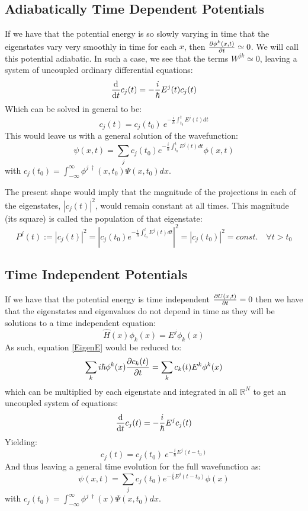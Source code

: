\documentclass[11pt, a4paper]{article} %
\newcommand{\R}{\mathbb{R}} %
\begin{document}
\subsection{Adiabatically Time Dependent Potentials}

If we have that the potential energy is so slowly varying in time that the eigenstates vary very smoothly in time for each $x$, then $\pdv{\phi^k(x,t)}{t}\simeq 0$. We will call this potential adiabatic. In such a case, we see that the terms $W^{jk}\simeq 0$, leaving a system of uncoupled ordinary differential equations:
\begin{equation}
\dv{}{t}c_j(t)=-\frac{i}{\hbar}E^j(t) c_j(t)
\end{equation}
Which can be solved in general to be:
\begin{equation}
c_j(t)=c_j(t_0)\ e^{-\frac{i}{\hbar}\int_{t_0}^{t}E^j(t) dt}
\end{equation}
This would leave us with a general solution of the wavefunction:
\begin{equation}
\psi(x,t)=\sum_j c_j(t_0) e^{-\frac{i}{\hbar}\int_{t_0}^{t}E^j(t) dt} \phi(x,t)
\end{equation}
with $c_j(t_0)=\int_{-\infty}^{\infty}\phi^{j\ \dagger}(x, t_0) \Psi(x,t_0)dx$.

The present shape would imply that the magnitude of the projections in each of the eigenstates, $|c_j(t)|^2$, would remain constant at all times. This magnitude (its square) is called the population of that eigenstate:
$$
P^j(t):=|c_j(t)|^2=|c_j(t_0)e^{-\frac{i}{\hbar}\int_{t_0}^{t}E^j(t) dt}|^2 = |c_j(t_0)|^2=const. \quad \forall t>t_0
$$

\subsection{Time Independent Potentials}

If we have that the potential energy is time independent $\pdv{U(x,t)}{t}=0$ then we have that the eigenstates and eigenvalues do not depend in time as they will be solutions to a time independent equation:
\begin{equation}
\hat{H}(x)\phi_k(x)=E^j\phi_k(x)
\end{equation}
As such, equation \eqref{EigenE} would be reduced to:
\begin{equation}
\sum_k i\hbar \phi^k(x)\pdv{c_k(t)}{t}= \sum_k c_k(t)E^k\phi^k(x)
\end{equation}
which can be multiplied by each eigenstate and integrated in all $\R^N$ to get an uncoupled system of equations:
\begin{equation}
\dv{}{t}c_j(t)=-\frac{i}{\hbar}E^j c_j(t)
\end{equation}
Yielding:
\begin{equation}
c_j(t)=c_j(t_0)\ e^{-\frac{i}{\hbar}E^j(t-t_0)}
\end{equation}
And thus leaving a general time evolution for the full wavefunction as:
\begin{equation}
\psi(x,t)=\sum_j c_j(t_0) e^{-\frac{i}{\hbar}E^j(t-t_0)} \phi(x)
\end{equation}
with $c_j(t_0)=\int_{-\infty}^{\infty}\phi^{j\ \dagger}(x) \Psi(x,t_0)dx$.
\end{document}
